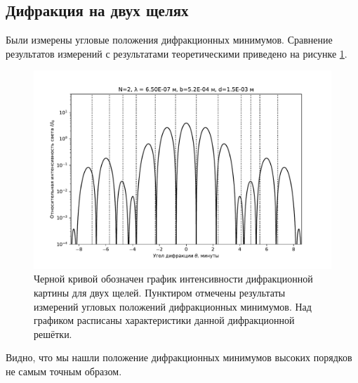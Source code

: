 \documentclass[12pt]{article}
\begin{document}
	\subsection{Дифракция на двух щелях}
	Были измерены угловые положения дифракционных минимумов. Сравнение результатов измерений с результатами теоретическими приведено на рисунке \ref{fig:figure3}.
	\begin{figure}[ht]
		\centering
		\includegraphics[width=\linewidth]{../plots/dif_2}
		\caption{Черной кривой обозначен график интенсивности дифракционной картины для двух щелей. Пунктиром отмечены результаты измерений угловых положений дифракционных минимумов. Над графиком расписаны характеристики данной дифракционной решётки.}
		\label{fig:figure3}
	\end{figure}
	Видно, что мы нашли положение дифракционных минимумов высоких порядков не самым точным образом.
\end{document}
